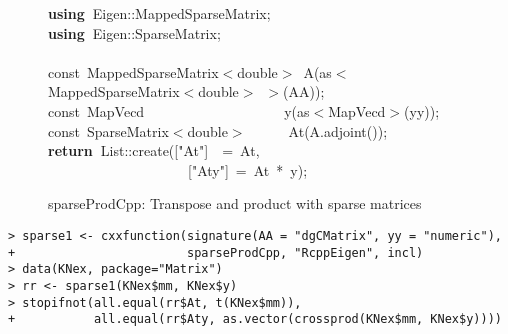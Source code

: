 \documentclass[shortnames,article]{jss}
\newcommand{\hlstd}[1]{\textcolor[rgb]{0,0,0}{#1}}
\newcommand{\hlopt}[1]{\textcolor[rgb]{0,0,0}{#1}}
\newcommand{\hlstr}[1]{\textcolor[rgb]{0.90,0.15,0.15}{#1}}
\newcommand{\hlkwa}[1]{\textcolor[rgb]{0.61,0.13,0.93}{\bf{#1}}}
\newcommand{\hlkwb}[1]{\textcolor[rgb]{0.13,0.54,0.13}{#1}}
\newcommand{\hlkwd}[1]{\textcolor[rgb]{0,0,0}{#1}}
\begin{document}
\begin{figure}[htb]
  \noindent
  \ttfamily
  \hlstd{}\hlkwa{using\ }\hlstd{Eigen}\hlopt{::}\hlstd{MappedSparseMatrix}\hlopt{;}\hspace*{\fill}\\
  \hlstd{}\hlkwa{using\ }\hlstd{Eigen}\hlopt{::}\hlstd{SparseMatrix}\hlopt{;}\hspace*{\fill}\\
  \hlstd{}\hspace*{\fill}\\
  \hlkwb{const\ }\hlstd{MappedSparseMatrix}\hlopt{$<$}\hlstd{}\hlkwb{double}\hlstd{}\hlopt{$>$\ }\hlstd{}\hlkwd{A}\hlstd{}\hlopt{(}\hlstd{as}\hlopt{$<$}\hlstd{MappedSparseMatrix}\hlopt{$<$}\hlstd{}\hlkwb{double}\hlstd{}\hlopt{$>$\ $>$(}\hlstd{AA}\hlopt{));}\hspace*{\fill}\\
  \hlstd{}\hlkwb{const\ }\hlstd{MapVecd}\hlstd{\ \ \ \ \ \ \ \ \ \ \ \ \ \ \ \ \ \ \ \ }\hlstd{}\hlkwd{y}\hlstd{}\hlopt{(}\hlstd{as}\hlopt{$<$}\hlstd{MapVecd}\hlopt{$>$(}\hlstd{yy}\hlopt{));}\hspace*{\fill}\\
  \hlstd{}\hlkwb{const\ }\hlstd{SparseMatrix}\hlopt{$<$}\hlstd{}\hlkwb{double}\hlstd{}\hlopt{$>$}\hlstd{\ \ \ \ \ \ }\hlopt{}\hlstd{}\hlkwd{At}\hlstd{}\hlopt{(}\hlstd{A}\hlopt{.}\hlstd{}\hlkwd{adjoint}\hlstd{}\hlopt{());}\hspace*{\fill}\\
  \hlstd{}\hlkwa{return\ }\hlstd{List}\hlopt{::}\hlstd{}\hlkwd{create}\hlstd{}\hlopt{(}\hlstd{\textunderscore }\hlopt{{[}}\hlstd{}\hlstr{"At"}\hlstd{}\hlopt{{]}}\hlstd{\ \ }\hlopt{=\ }\hlstd{At}\hlopt{,}\hspace*{\fill}\\
  \hlstd{}\hlstd{\ \ \ \ \ \ \ \ \ \ \ \ \ \ \ \ \ \ \ \ }\hlstd{\textunderscore }\hlopt{{[}}\hlstd{}\hlstr{"Aty"}\hlstd{}\hlopt{{]}\ =\ }\hlstd{At\ }\hlopt{{*}\ }\hlstd{y}\hlopt{);}\hlstd{}\hspace*{\fill}\\
  \mbox{}
  \normalfont
  \normalsize
  \caption{sparseProdCpp: Transpose and product with sparse matrices}
  \label{sparseProd}
\end{figure}

\begin{verbatim}
> sparse1 <- cxxfunction(signature(AA = "dgCMatrix", yy = "numeric"),
+                        sparseProdCpp, "RcppEigen", incl)
> data(KNex, package="Matrix")
> rr <- sparse1(KNex$mm, KNex$y)
> stopifnot(all.equal(rr$At, t(KNex$mm)),
+           all.equal(rr$Aty, as.vector(crossprod(KNex$mm, KNex$y))))
\end{verbatim}
\end{document}
